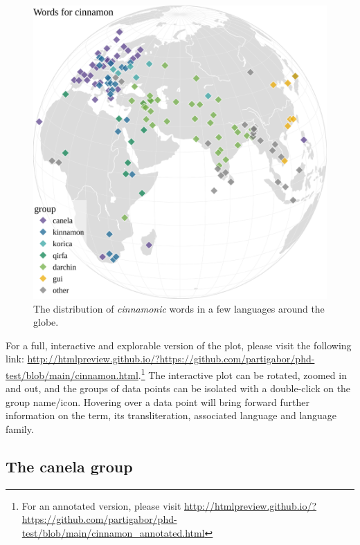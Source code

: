 \begin{figure}[!ht]
    \centering
    \includegraphics[width=\linewidth]{imgs/plots/distribution_cinnamon.pdf}
    \caption{The distribution of \textit{cinnamonic} words in a few languages around the globe.}
    \label{fig:cinnamon_distribution}
\end{figure}

\begin{note}
For a full, interactive and explorable version of the plot, please visit the following link: \url{http://htmlpreview.github.io/?https://github.com/partigabor/phd-test/blob/main/cinnamon.html}.\footnote{For an annotated version, please visit \url{http://htmlpreview.github.io/?https://github.com/partigabor/phd-test/blob/main/cinnamon_annotated.html}} The interactive plot can be rotated, zoomed in and out, and the groups of data points can be isolated with a double-click on the group name/icon. Hovering over a data point will bring forward further information on the term, its transliteration, associated language and language family.
\end{note}

\subsection{The canela group}

